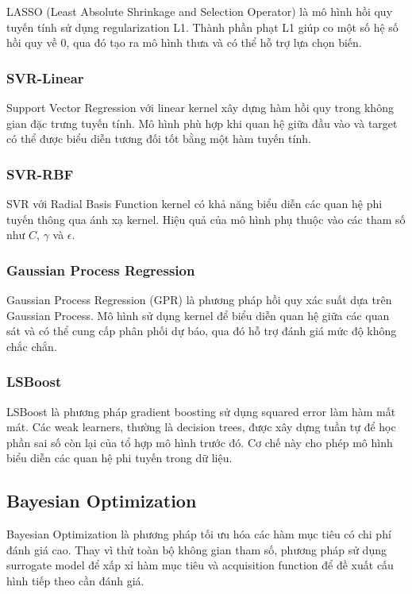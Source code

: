 LASSO (Least Absolute Shrinkage and Selection Operator) là mô hình
hồi quy tuyến tính sử dụng regularization L1. Thành phần phạt L1
giúp co một số hệ số hồi quy về 0, qua đó tạo ra mô hình thưa và
có thể hỗ trợ lựa chọn biến.

\subsubsection{SVR-Linear}

Support Vector Regression với linear kernel xây dựng hàm hồi quy
trong không gian đặc trưng tuyến tính. Mô hình phù hợp khi quan hệ
giữa đầu vào và target có thể được biểu diễn tương đối tốt bằng
một hàm tuyến tính.

\subsubsection{SVR-RBF}

SVR với Radial Basis Function kernel có khả năng biểu diễn các
quan hệ phi tuyến thông qua ánh xạ kernel. Hiệu quả của mô hình
phụ thuộc vào các tham số như $C$, $\gamma$ và $\epsilon$.

\subsubsection{Gaussian Process Regression}

Gaussian Process Regression (GPR) là phương pháp hồi quy xác suất
dựa trên Gaussian Process. Mô hình sử dụng kernel để biểu diễn quan
hệ giữa các quan sát và có thể cung cấp phân phối dự báo, qua đó
hỗ trợ đánh giá mức độ không chắc chắn.

\subsubsection{LSBoost}

LSBoost là phương pháp gradient boosting sử dụng squared error
làm hàm mất mát. Các weak learners, thường là decision trees,
được xây dựng tuần tự để học phần sai số còn lại của tổ hợp mô hình
trước đó. Cơ chế này cho phép mô hình biểu diễn các quan hệ phi
tuyến trong dữ liệu.

\subsection{Bayesian Optimization}
\label{subsec:bayesian-optimization-original}

Bayesian Optimization là phương pháp tối ưu hóa các hàm mục tiêu
có chi phí đánh giá cao. Thay vì thử toàn bộ không gian tham số,
phương pháp sử dụng surrogate model để xấp xỉ hàm mục tiêu và
acquisition function để đề xuất cấu hình tiếp theo cần đánh giá.

